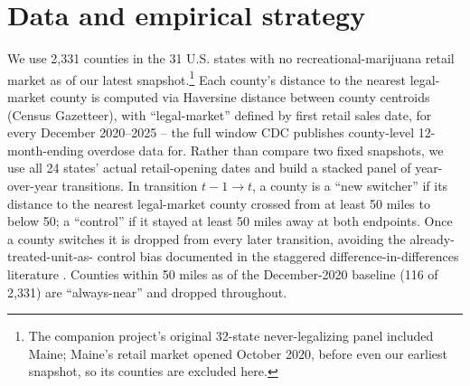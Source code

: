 \documentclass[12pt]{article}
\begin{document}
\section{Data and empirical strategy}

We use 2,331 counties in the 31 U.S. states with no
recreational-marijuana retail market as of our latest
snapshot.\footnote{The companion project's original 32-state
never-legalizing panel included Maine; Maine's retail market opened
October 2020, before even our earliest snapshot, so its counties are
excluded here.} Each county's distance to the nearest legal-market
county is computed via Haversine distance between county centroids
(Census Gazetteer), with ``legal-market'' defined by first retail
sales date, for every December 2020--2025 -- the full window CDC
publishes county-level 12-month-ending overdose data for. Rather than
compare two fixed snapshots, we use all 24 states' actual
retail-opening dates and build a stacked panel of year-over-year
transitions. In transition $t-1\to t$, a county is a ``new switcher''
if its distance to the nearest legal-market county crossed from at
least 50 miles to below 50; a ``control'' if it stayed at least 50
miles away at both endpoints. Once a county switches it is dropped
from every later transition, avoiding the already-treated-unit-as-
control bias documented in the staggered difference-in-differences
literature \citep{GoodmanBacon2021}. Counties within 50 miles as of
the December-2020 baseline (116 of 2,331) are ``always-near'' and
dropped throughout.
\end{document}
